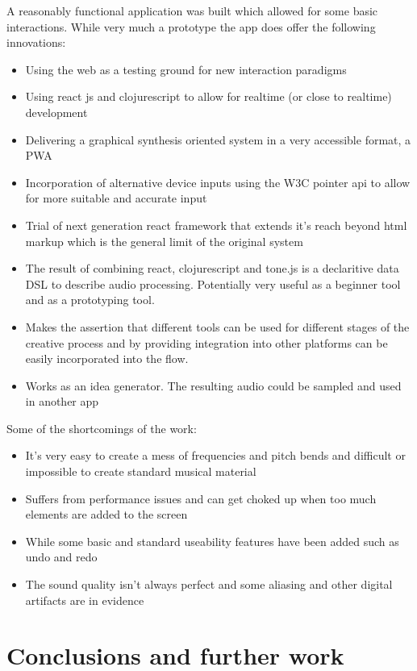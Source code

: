 \documentclass[a4paper,12pt]{article}
\begin{document}
A reasonably functional application was built which allowed for some basic
interactions. While very much a prototype the app does offer the following
innovations:

\begin{itemize}
\item Using the web as a testing ground for new interaction paradigms
\item Using react js and clojurescript to allow for realtime (or close to realtime)
development
\item Delivering a graphical synthesis oriented system in a very accessible format,
a PWA
\item Incorporation of alternative device inputs using the W3C pointer api to allow
for more suitable and accurate input
\item Trial of next generation react framework that extends it's reach beyond html
markup which is the general limit of the original system
\item The result of combining react, clojurescript and tone.js is a declaritive data
DSL to describe audio processing. Potentially very useful as a beginner tool
and as a prototyping tool.
\item Makes the assertion that different tools can be used for different stages of
the creative process and by providing integration into other platforms can be
easily incorporated into the flow.
\item Works as an idea generator. The resulting audio could be sampled and used in
another app
\end{itemize}

Some of the shortcomings of the work:
\begin{itemize}
\item It's very easy to create a mess of frequencies and pitch bends and difficult
or impossible to create standard musical material
\item Suffers from performance issues and can get choked up when too much elements
are added to the screen
\item While some basic and standard useability features have been added such as
undo and redo
\item The sound quality isn't always perfect and some aliasing and other digital
artifacts are in evidence
\end{itemize}


\section{Conclusions and further work}
\label{sec:org2164899}
\end{document}
